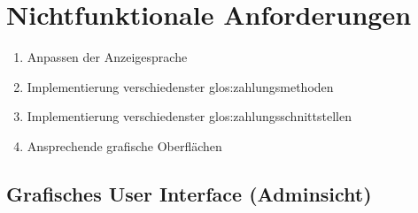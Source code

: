 \documentclass{lastenheft}
\begin{document}
\section{Nichtfunktionale Anforderungen}

\begin{enumerate}[font={\bfseries},label={NFRQ\arabic*:}]
    \item Anpassen der Anzeigesprache
    \item Implementierung verschiedenster \gls{glos:zahlungsmethode}n
    \item Implementierung verschiedenster \gls{glos:zahlungsschnittstelle}n
    \item Ansprechende grafische Oberflächen
\end{enumerate}

\subsection{Grafisches User Interface (Adminsicht)}
%


\clearpage

\printnoidxglossaries
{}

\clearpage
%
\end{document}
